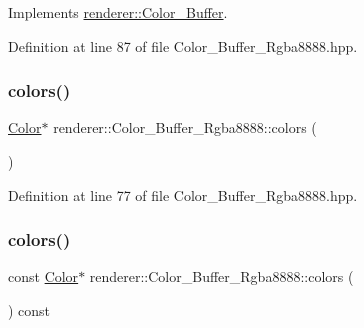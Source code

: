 Implements \mbox{\hyperlink{classrenderer_1_1_color___buffer_ac03bd34681ed79f8b36c9c7292db98e4}{renderer\+::\+Color\+\_\+\+Buffer}}.



Definition at line 87 of file Color\+\_\+\+Buffer\+\_\+\+Rgba8888.\+hpp.

\mbox{\label{classrenderer_1_1_color___buffer___rgba8888_a5061946117fc186aedee4747e1d1129c}} 
\subsubsection{\texorpdfstring{colors()}{colors()}\hspace{0.1cm}{\footnotesize\ttfamily [1/2]}}
{\footnotesize\ttfamily \mbox{\hyperlink{structrenderer_1_1_color___buffer___rgba8888_1_1_color}{Color}}$\ast$ renderer\+::\+Color\+\_\+\+Buffer\+\_\+\+Rgba8888\+::colors (\begin{DoxyParamCaption}{ }\end{DoxyParamCaption})\hspace{0.3cm}{\ttfamily [inline]}}



Definition at line 77 of file Color\+\_\+\+Buffer\+\_\+\+Rgba8888.\+hpp.

\mbox{\label{classrenderer_1_1_color___buffer___rgba8888_afd85a2353b0f11ea29dfd0e48446dbb4}} 
\subsubsection{\texorpdfstring{colors()}{colors()}\hspace{0.1cm}{\footnotesize\ttfamily [2/2]}}
{\footnotesize\ttfamily const \mbox{\hyperlink{structrenderer_1_1_color___buffer___rgba8888_1_1_color}{Color}}$\ast$ renderer\+::\+Color\+\_\+\+Buffer\+\_\+\+Rgba8888\+::colors (\begin{DoxyParamCaption}{ }\end{DoxyParamCaption}) const\hspace{0.3cm}{\ttfamily [inline]}}



